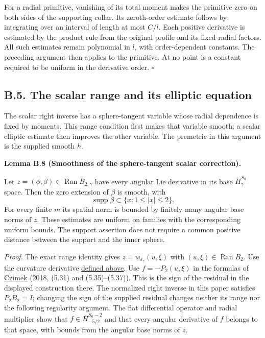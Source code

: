 \documentclass[
  english,
  11pt,
  reqno]{amsart}
\makeatletter
\newcommand{\pandocstatementheading}[1]{%
  \par\if@nobreak\else
    \addpenalty{\@beginparpenalty}%
    \addvspace{.5\baselineskip plus .2\baselineskip minus .2\baselineskip}%
  \fi
  {\normalfont\bfseries #1\par}%
  \nobreak\@afterindenttrue\@afterheading
}
\makeatother
\begin{document}
For a radial primitive, vanishing of its total moment makes the
primitive zero on both sides of the supporting collar. Its zeroth-order
estimate follows by integrating over an interval of length at most
\(C/l\). Each positive derivative is estimated by the product rule from
the original profile and its fixed radial factors. All such estimates
remain polynomial in \(l\), with order-dependent constants. The
preceding argument then applies to the primitive. At no point is a
constant required to be uniform in the derivative order.
\hfill\(\square\)

\subsection{B.5. The scalar range and its elliptic
equation}\label{b.5.-the-scalar-range-and-its-elliptic-equation}\label{sec:online-extension-scalar-range}

The scalar right inverse has a sphere-tangent variable whose radial
dependence is fixed by moments. This range condition first makes that
variable smooth; a scalar elliptic estimate then improves the other
variable. The premetric in this argument is the supplied smooth
\(\widehat h\).

\pandocstatementheading{\leavevmode{}\label{lem:online-extension-scalar-tangent-smooth}Lemma B.8 (Smoothness of the sphere-tangent scalar correction).}

Let \(z=(\phi,\beta)\in\operatorname{Ran}B_{2,\gamma}\) have every
angular Lie derivative in its base \(\overline H^{S_0}_\gamma\) space.
Then the zero extension of \(\beta\) is smooth, with%
 \[
\operatorname{supp}\beta\subset\{x:1\le|x|\le2\}.
\] For every finite \(m\) its spatial norm is bounded by finitely many
angular base norms of \(z\). These estimates are uniform on families
with the corresponding uniform bounds. The support assertion does not
require a common positive distance between the support and the inner
sphere.

\emph{Proof.} The exact range identity gives
\(z=w_{\varepsilon_\gamma}(u,\xi)\) with
\((u,\xi)\in\operatorname{Ran}B_2\). Use the curvature derivative
\hyperref[eq:online-extension-scalar-flat-operator]{defined above}. Use
\(f=-P_2(u,\xi)\) in the formulas of \hyperref[ref-Czimek2018]{Czimek}
(2018, (5.31) and (5.35)--(5.37)). This is the sign of the residual in
the displayed construction there. The normalized right inverse in this
paper satisfies \(P_2B_2=I\); changing the sign of the supplied residual
changes neither its range nor the following regularity argument. The
flat differential operator and radial multiplier show that
\(f\in\overline H^{S_0-2}_{-5/2}\) and that every angular derivative of
\(f\) belongs to that space, with bounds from the angular base norms of
\(z\).
\end{document}
